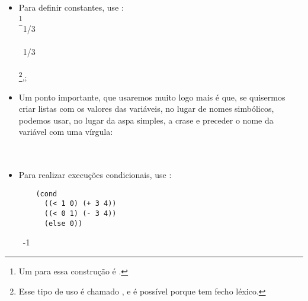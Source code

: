 \documentclass{article}
\begin{document}
\begin{itemize}
{    ter fórmulas crescendo linearmente na horizontal (note que o
    ``chapéu'' faz com que a fórmula cresça para cima), então decidiu
    mover o chapéu para o lado, obtendo .
    Mas o chapéu flutuando parece engraçado, então Church o trocou
    pelo  o símbolo não usado mais próximo que tinha, um $\Lambda$, como em
    . Mas
    $\Lambda$ tem uma grafia muito parecida com outra letra comum, o que foi
    percebido como um incoveniente, então ele acabou eventualmente
    trocando para $\lambda$ em sua teoria, que acabou se chamando
     \cite{norvig}.}:\\
   \seta\ 1/3n

\item Para definir constantes, use :\\
  \footnote{Um
     para essa construção é
    .}\\
   \seta\ 1/3\\
  \\
   \seta\ 1/3\\
  \\
   \footnote{Esse tipo de uso é chamado
    , e é possível porque  tem
    fecho léxico.},;

\item  Um ponto importante, que usaremos muito logo mais é que, se
  quisermos criar listas com os valores das variáveis, no lugar de
  nomes simbólicos, podemos usar, no lugar da aspa simples, a crase e
  preceder o nome da variável com uma vírgula:\\
  \\
   \seta\ 

\item Para realizar execuções condicionais, use :\\
  \begin{lstlisting}
    (cond
      ((< 1 0) (+ 3 4))
      ((< 0 1) (- 3 4))
      (else 0))
  \end{lstlisting}
  \hspace{1cm} \seta\ -1\\
  

\end{itemize}
\end{document}
